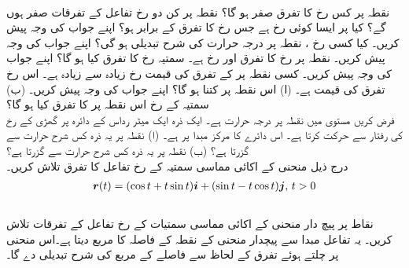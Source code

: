 \\
نقطہ  پر کس رخ  کا تفرق صفر ہو گا؟
نقطہ  پر کن دو رخ تفاعل  کے تفرقات  صفر ہوں گے؟
کیا  پر ایسا کوئی  رخ  ہے جس رخ   کا تفرق  کے برابر ہو؟ اپنے جواب کی وجہ پیش کریں۔
کیا کسی رخ ،  نقطہ  پر  درجہ حرارت     کی شرح تبدیلی  ہو گی؟ اپنے جواب کی وجہ پیش کریں۔
نقطہ  پر  رخ   کا تفرق   اور  رخ  ہے۔   سمتیہ   رخ  کا تفرق کیا ہو گا؟ اپنے جواب کی وجہ پیش کریں۔
کسی نقطہ پر  کے تفرق کی قیمت  رخ  زیادہ سے زیادہ ہے۔ اس رخ تفرق کی قیمت  ہے۔ (ا) اس نقطہ پر  کتنا ہو گا؟ اپنے جواب کی وجہ پیش کریں۔ (ب) سمتیہ    کے رخ  اس نقطہ پر   کا تفرق کیا ہو گا؟
\\
فرض کریں مستوی  میں  نقطہ   پر درجہ حرارت    ہے۔  ایک ذرہ  ایک میٹر رداس کے دائرہ پر  گھڑی کے رخ   کی  رفتار سے حرکت کرتا ہے۔ اس دائرے کا مرکز مبدا پر ہے۔ (ا)  نقطہ  پر یہ ذرہ  کس شرح حرارت    سے گزرتا ہے؟ (ب)     نقطہ  پر یہ ذرہ  کس شرح حرارت    سے گزرتا ہے؟ 
\\
درج ذیل منحنی  کے   اکائی مماسی سمتیہ  کے رخ تفاعل  کا تفرق   تلاش کریں۔
\begin{align*}
{\ensuremath{{\boldsymbol{r}}}}(t)=(\cos t+t\sin t){\boldsymbol{i}}+(\sin t-t\cos t){\boldsymbol{j}},\,t>0
\end{align*}
\\
نقاط   پر پیچ دار  منحنی   کے اکائی مماسی سمتیات کے رخ     تفاعل  کے تفرقات   تلاش کریں۔ یہ تفاعل مبدا سے پیچدار منحنی کے نقطہ  کے  فاصلہ کا مربع  دیتا ہے۔اس منحنی پر چلتے ہوئے   تفرق    کے لحاظ سے فاصلے کے مربع کی شرح تبدیلی دے گا۔
